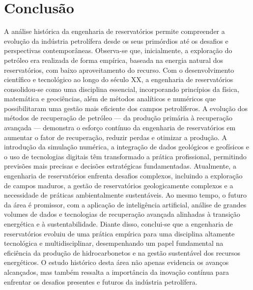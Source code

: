 \documentclass[12pt,a4paper]{report}
\begin{document}
\chapter{Conclusão}
A análise histórica da engenharia de reservatórios permite compreender a evolução da indústria petrolífera desde os seus primórdios até os desafios e perspectivas contemporâneas. Observa-se que, inicialmente, a exploração do petróleo era realizada de forma empírica, baseada na energia natural dos reservatórios, com baixo aproveitamento do recurso. Com o desenvolvimento científico e tecnológico ao longo do século XX, a engenharia de reservatórios consolidou-se como uma disciplina essencial, incorporando princípios da física, matemática e geociências, além de métodos analíticos e numéricos que possibilitaram uma gestão mais eficiente dos campos petrolíferos.
A evolução dos métodos de recuperação de petróleo — da produção primária à recuperação avançada — demonstra o esforço contínuo da engenharia de reservatórios em aumentar o fator de recuperação, reduzir perdas e otimizar a produção. A introdução da simulação numérica, a integração de dados geológicos e geofísicos e o uso de tecnologias digitais têm transformado a prática profissional, permitindo previsões mais precisas e decisões estratégicas fundamentadas.
Atualmente, a engenharia de reservatórios enfrenta desafios complexos, incluindo a exploração de campos maduros, a gestão de reservatórios geologicamente complexos e a necessidade de práticas ambientalmente sustentáveis. Ao mesmo tempo, o futuro da área é promissor, com a aplicação de inteligência artificial, análise de grandes volumes de dados e tecnologias de recuperação avançada alinhadas à transição energética e à sustentabilidade.
Diante disso, conclui-se que a engenharia de reservatórios evoluiu de uma prática empírica para uma disciplina altamente tecnológica e multidisciplinar, desempenhando um papel fundamental na eficiência da produção de hidrocarbonetos e na gestão sustentável dos recursos energéticos. O estudo histórico desta área não apenas evidencia os avanços alcançados, mas também ressalta a importância da inovação contínua para enfrentar os desafios presentes e futuros da indústria petrolífera.



\end{document}
